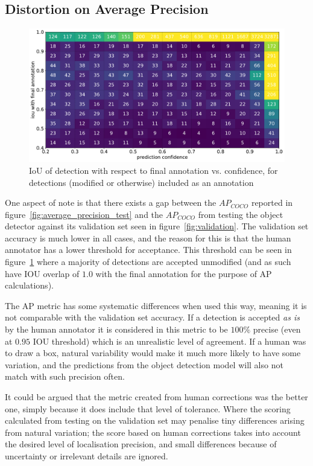\subsection{Distortion on Average Precision}
\label{sec:distortion_precision}

\begin{figure}[ht]
\centering
\includegraphics[width=1.0\linewidth]{charts/scatters/confidence_iou.pdf}
\caption{ IoU of detection with respect to final annotation vs. confidence, for detections (modified or otherwise) included as an annotation }
\label{fig:iou_confidence}
\end{figure}

One aspect of note is that there exists a gap between the $AP_{COCO}$ reported in figure~\ref{fig:average_precision_test} and the $AP_{COCO}$ from testing the object detector against its validation set seen in figure~\ref{fig:validation}. The validation set accuracy is much lower in all cases, and the reason for this is that the human annotator has a lower threshold for acceptance. This threshold can be seen in figure~\ref{fig:iou_confidence} where a majority of detections are accepted unmodified (and as such have \gls{IOU} overlap of $1.0$ with the final annotation for the purpose of \gls{AP} calculations).

The \gls{AP} metric has some systematic differences when used this way, meaning it is not comparable with the validation set accuracy. If a detection is accepted \emph{as is} by the human annotator it is considered in this metric to be $100\%$ precise (even at $0.95$ \gls{IOU} threshold) which is an unrealistic level of agreement. If a human was to draw a box, natural variability would make it much more likely to have some variation, and the predictions from the object detection model will also not match with such precision often.

It could be argued that the metric created from human corrections was the better one, simply because it does include that level of tolerance. Where the scoring calculated from testing on the validation set may penalise tiny differences arising from natural variation; the score based on human corrections takes into account the desired level of localisation precision, and small differences because of uncertainty or irrelevant details are ignored.

